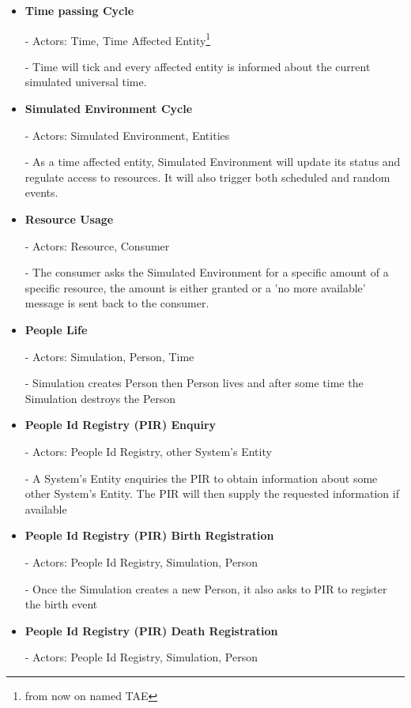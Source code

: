 \begin{itemize}
  \item \textbf{Time passing Cycle}  
	
	- Actors: Time, Time Affected Entity\footnote{from now on named TAE}

	- Time will tick and every affected entity is informed about the current simulated universal time.

  \item \textbf{Simulated Environment Cycle}

	- Actors: Simulated Environment, Entities

	- As a time affected entity, Simulated Environment will update its status and regulate access to resources. It will also trigger both scheduled and random events.

  \item \textbf{Resource Usage}

	- Actors: Resource, Consumer

	- The consumer asks the Simulated Environment for a specific amount of a specific resource, the amount is either granted or a 'no more available' message is sent back to the consumer.

  \item \textbf{People Life} 

	- Actors: Simulation, Person, Time

	- Simulation creates Person then Person lives and after some time the Simulation destroys the Person

  \item \textbf{People Id Registry (PIR) Enquiry}

	- Actors: People Id Registry, other System's Entity

	- A System's Entity enquiries the PIR to obtain information about some other System's Entity. The PIR will then supply the requested information  if available

  \item \textbf{People Id Registry (PIR) Birth Registration}

	- Actors: People Id Registry, Simulation, Person

	- Once the Simulation creates a new Person, it also asks to PIR to register the birth event

  \item \textbf{People Id Registry (PIR) Death Registration}

	- Actors: People Id Registry, Simulation, Person


\end{itemize}

